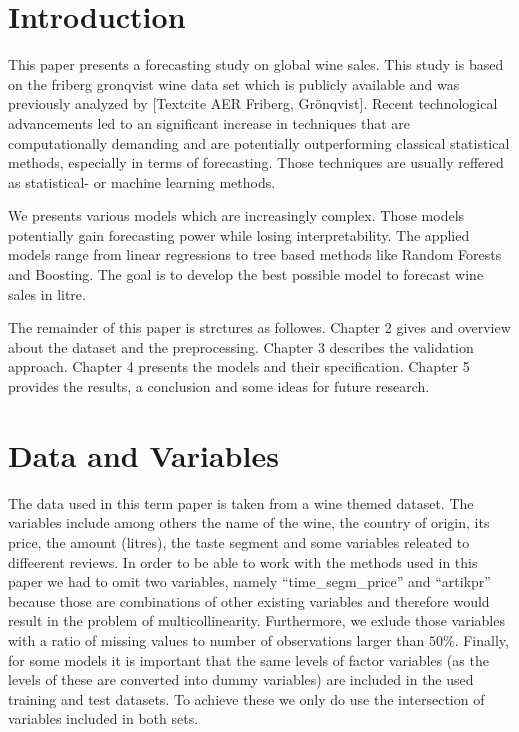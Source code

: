 \documentclass[11pt,]{article}
\begin{document}
{
\hypersetup{linkcolor=black}
\setcounter{tocdepth}{3}
\tableofcontents
}
\newpage
\listoftables
\newpage
\listoffigures
\newpage
{} 
\hypertarget{introduction}{%
\section{Introduction}\label{introduction}}

This paper presents a forecasting study on global wine sales. This study
is based on the friberg gronqvist wine data set which is publicly
available and was previously analyzed by {[}Textcite AER Friberg,
Grönqvist{]}. Recent technological advancements led to an significant
increase in techniques that are computationally demanding and are
potentially outperforming classical statistical methods, especially in
terms of forecasting. Those techniques are usually reffered as
statistical- or machine learning methods.

We presents various models which are increasingly complex. Those models
potentially gain forecasting power while losing interpretability. The
applied models range from linear regressions to tree based methods like
Random Forests and Boosting. The goal is to develop the best possible
model to forecast wine sales in litre.

The remainder of this paper is strctures as followes. Chapter 2 gives
and overview about the dataset and the preprocessing. Chapter 3
describes the validation approach. Chapter 4 presents the models and
their specification. Chapter 5 provides the results, a conclusion and
some ideas for future research.

\hypertarget{data-and-variables}{%
\section{Data and Variables}\label{data-and-variables}}

The data used in this term paper is taken from a wine themed dataset.
The variables include among others the name of the wine, the country of
origin, its price, the amount (litres), the taste segment and some
variables releated to diffeerent reviews. In order to be able to work
with the methods used in this paper we had to omit two variables, namely
\enquote{time\_segm\_price} and \enquote{artikpr} because those are
combinations of other existing variables and therefore would result in
the problem of multicollinearity. Furthermore, we exlude those variables
with a ratio of missing values to number of observations larger than
\(50\%\). Finally, for some models it is important that the same levels
of factor variables (as the levels of these are converted into dummy
variables) are included in the used training and test datasets. To
achieve these we only do use the intersection of variables included in
both sets.
\end{document}
